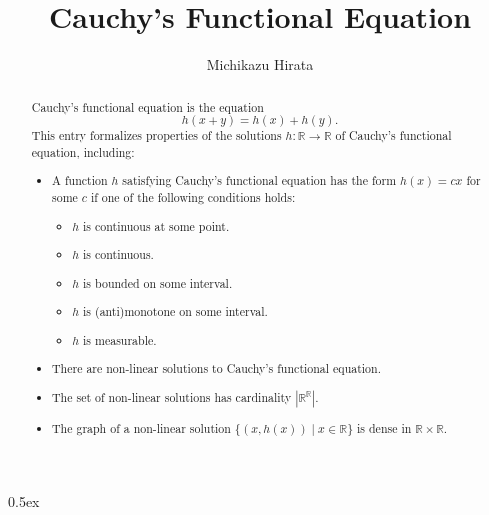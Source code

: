 \documentclass[11pt,a4paper]{article}
\begin{document}
\title{Cauchy's Functional Equation}
\author{Michikazu Hirata}
\maketitle
\begin{abstract}
  Cauchy's functional equation is the equation
  \[h(x + y) = h(x) + h(y).\]
  This entry formalizes properties of the solutions
  $h:\mathbb{R}\to\mathbb{R}$ of Cauchy's functional equation, including:
  \begin{itemize}
  \item A function $h$ satisfying Cauchy's functional equation has the form
        $h(x) = c x$ for some $c$ if one of the following conditions holds:
    \begin{itemize}
    \item $h$ is continuous at some point.
    \item $h$ is continuous.
    \item $h$ is bounded on some interval.
    \item $h$ is (anti)monotone on some interval.
    \item $h$ is measurable.
    \end{itemize}
  \item There are non-linear solutions to Cauchy's functional equation.
  \item The set of non-linear solutions has cardinality $|\mathbb{R}^{\mathbb{R}}|$.
  \item The graph of a non-linear solution $\{(x,h(x))\mid x\in\mathbb{R}\}$ is
  dense in $\mathbb{R}\times\mathbb{R}$.
  \end{itemize}
\end{abstract}

\tableofcontents

\parindent 0pt\parskip 0.5ex





\end{document}
